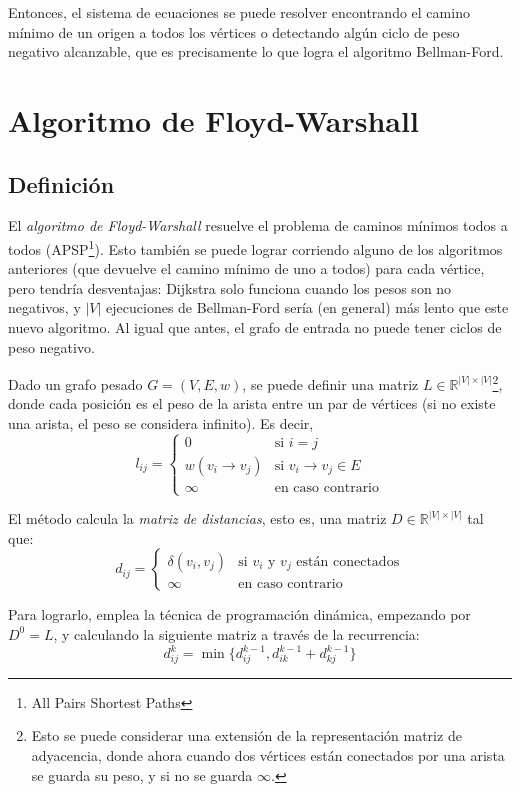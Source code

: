 \documentclass[a4paper]{report}
\newcommand{\si}{\text{si }}
\newcommand{\ecc}{\text{en caso contrario}}
\newcommand{\R}{\mathbb{R}}
\begin{document}
Entonces, el sistema de ecuaciones se puede resolver encontrando el camino mínimo de un origen a todos los vértices o detectando algún ciclo de peso negativo alcanzable, que es precisamente lo que logra el algoritmo Bellman-Ford.

\section{Algoritmo de Floyd-Warshall}

\subsection{Definición}

El \textit{algoritmo de Floyd-Warshall} resuelve el problema de caminos mínimos todos a todos (APSP\footnote{All Pairs Shortest Paths}). Esto también se puede lograr corriendo alguno de los algoritmos anteriores (que devuelve el camino mínimo de uno a todos) para cada vértice, pero tendría desventajas: Dijkstra solo funciona cuando los pesos son no negativos, y $|V|$ ejecuciones  de Bellman-Ford sería (en general) más lento que este nuevo algoritmo. Al igual que antes, el grafo de entrada no puede tener ciclos de peso negativo.

Dado un grafo pesado $G = (V, E, w)$, se puede definir una matriz $L \in \R^{|V| \times |V|}$\footnote{Esto se puede considerar una extensión de la representación matriz de adyacencia, donde ahora cuando dos vértices están conectados por una arista se guarda su peso, y si no se guarda $\infty$.}, donde cada posición es el peso de la arista entre un par de vértices (si no existe una arista, el peso se considera infinito). Es decir,
$$
    l_{ij} =
    \begin{cases}
        0                      & \si i = j                     \\
        w(v_i \rightarrow v_j) & \si v_i \rightarrow v_j \in E \\
        \infty                 & \ecc
    \end{cases}
$$


El método calcula la \textit{matriz de distancias}, esto es, una matriz $D \in \R^{|V| \times |V|}$ tal que:
$$d_{ij} =
    \begin{cases}
        \delta(v_i, v_j) & \si \text{$v_i$ y $v_j$ están conectados} \\
        \infty           & \ecc
    \end{cases}$$

Para lograrlo, emplea la técnica de programación dinámica, empezando por $D^0 = L$, y calculando la siguiente matriz a través de la recurrencia:
$$d^k_{ij} = \min{\{d^{k - 1}_{ij}, d^{k - 1}_{ik} + d^{k - 1}_{kj}\}}$$
\end{document}
